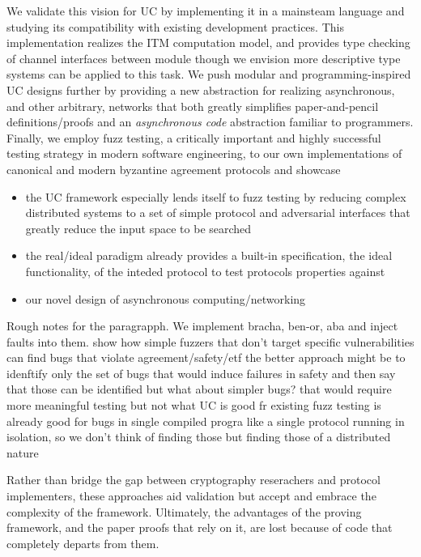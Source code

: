 We validate this vision for UC by implementing it in a mainsteam language and studying its compatibility with existing development practices. 
 This implementation realizes the ITM computation model, and provides type checking of channel interfaces between module though we envision more descriptive type systems can be applied to this task.
We push modular and programming-inspired UC designs further by providing a new abstraction for realizing asynchronous, and other arbitrary, networks that both greatly simplifies paper-and-pencil definitions/proofs and an \emph{asynchronous code} abstraction familiar to programmers.
Finally, we employ fuzz testing, a critically important and highly successful testing strategy in modern software engineering, to our own implementations of canonical and modern byzantine agreement protocols and showcase
\begin{itemize}
\item the UC framework especially lends itself to fuzz testing by reducing complex distributed systems to a set of simple protocol and adversarial interfaces that greatly reduce the input space to be searched
\item the real/ideal paradigm already provides a built-in specification, the ideal functionality, of the inteded protocol to test protocols properties against
\item our novel design of asynchronous computing/networking 
\end{itemize}

Rough notes for the paragrapph. 
We implement bracha, ben-or, aba and inject faults into them. show how simple fuzzers that don't target specific vulnerabilities can find bugs that violate agreement/safety/etf
the better approach might be to idenftify only the set of bugs that would induce failures in safety and then say that those can be identified
but what about simpler bugs? that would require more meaningful testing but not what UC is good fr
existing fuzz testing is already good for bugs in single compiled progra like a single protocol running in isolation, so we don't think of finding those
but finding those of a distributed nature


Rather than bridge the gap between cryptography reserachers and protocol implementers, these approaches aid validation but accept and embrace the complexity of the framework.
Ultimately, the advantages of the proving framework, and the paper proofs that rely on it, are lost because of code that completely departs from them. 




